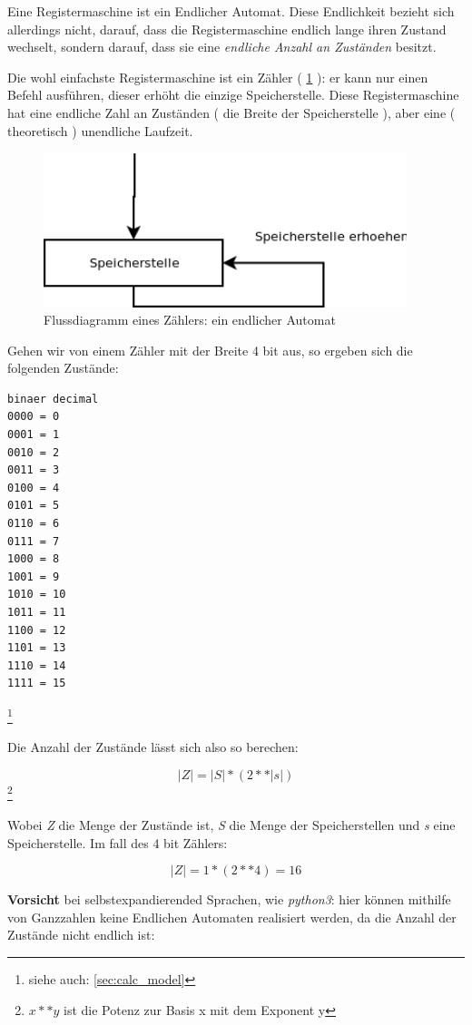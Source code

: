 \documentclass[a4paper,12pt,oneside]{scrreprt}
\begin{document}
Eine Registermaschine ist ein Endlicher Automat. Diese Endlichkeit bezieht sich allerdings nicht, darauf, dass die Registermaschine endlich lange ihren Zustand wechselt, sondern darauf, dass sie eine \textit{endliche Anzahl an Zuständen} besitzt.

Die wohl einfachste Registermaschine ist ein Zähler ( \ref{fig:zaehler} ): er kann nur einen Befehl ausführen, dieser erhöht die einzige Speicherstelle. Diese Registermaschine hat eine endliche Zahl an Zuständen ( die Breite der Speicherstelle ), aber eine ( theoretisch ) unendliche Laufzeit.

\begin{figure}
\centering
\includegraphics[width=300pt]{zaehler.png}
\caption[Flussdiagramm Zähler]{Flussdiagramm eines Zählers: ein endlicher Automat}
\label{fig:zaehler}
\end{figure}

Gehen wir von einem Zähler mit der Breite 4 bit aus, so ergeben sich die folgenden Zustände:

\begin{lstlisting}[frame=single]
binaer decimal
0000 = 0
0001 = 1
0010 = 2
0011 = 3
0100 = 4
0101 = 5
0110 = 6
0111 = 7
1000 = 8
1001 = 9
1010 = 10
1011 = 11
1100 = 12
1101 = 13
1110 = 14
1111 = 15
\end{lstlisting}\footnote{siehe auch: \ref{sec:calc_model} }

Die Anzahl der Zustände lässt sich also so berechen: 

$$ |Z| = |S| * ( 2 ** |s| ) $$ \footnote{ $ x ** y $ ist die Potenz zur Basis x mit dem Exponent y }

Wobei \textit{Z} die Menge der Zustände ist, \textit{S} die Menge der Speicherstellen und \textit{s} eine Speicherstelle.
Im fall des 4 bit Zählers:

$$ |Z| = 1 * ( 2 ** 4 ) = 16 $$

\textbf{Vorsicht} bei selbstexpandierended Sprachen, wie \textit{python3}: hier können mithilfe von Ganzzahlen keine Endlichen Automaten realisiert werden, da die Anzahl der Zustände nicht endlich ist:
\end{document}
